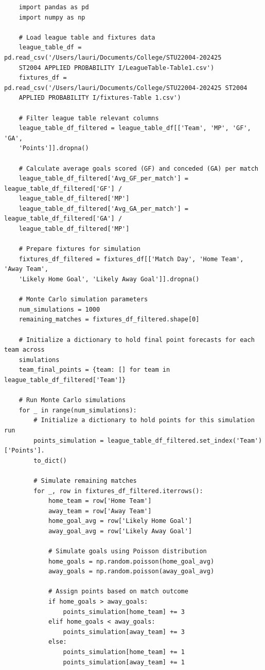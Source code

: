 \documentclass{article}
\begin{document}
\begin{verbatim}
    import pandas as pd
    import numpy as np
    
    # Load league table and fixtures data
    league_table_df = pd.read_csv('/Users/lauri/Documents/College/STU22004-202425 
    ST2004 APPLIED PROBABILITY I/LeagueTable-Table1.csv')
    fixtures_df = pd.read_csv('/Users/lauri/Documents/College/STU22004-202425 ST2004 
    APPLIED PROBABILITY I/fixtures-Table 1.csv')
    
    # Filter league table relevant columns
    league_table_df_filtered = league_table_df[['Team', 'MP', 'GF', 'GA', 
    'Points']].dropna()
    
    # Calculate average goals scored (GF) and conceded (GA) per match
    league_table_df_filtered['Avg_GF_per_match'] = league_table_df_filtered['GF'] / 
    league_table_df_filtered['MP']
    league_table_df_filtered['Avg_GA_per_match'] = league_table_df_filtered['GA'] / 
    league_table_df_filtered['MP']
    
    # Prepare fixtures for simulation
    fixtures_df_filtered = fixtures_df[['Match Day', 'Home Team', 'Away Team', 
    'Likely Home Goal', 'Likely Away Goal']].dropna()
    
    # Monte Carlo simulation parameters
    num_simulations = 1000
    remaining_matches = fixtures_df_filtered.shape[0]
    
    # Initialize a dictionary to hold final point forecasts for each team across 
    simulations
    team_final_points = {team: [] for team in league_table_df_filtered['Team']}
    
    # Run Monte Carlo simulations
    for _ in range(num_simulations):
        # Initialize a dictionary to hold points for this simulation run
        points_simulation = league_table_df_filtered.set_index('Team')['Points'].
        to_dict()
    
        # Simulate remaining matches
        for _, row in fixtures_df_filtered.iterrows():
            home_team = row['Home Team']
            away_team = row['Away Team']
            home_goal_avg = row['Likely Home Goal']
            away_goal_avg = row['Likely Away Goal']
    
            # Simulate goals using Poisson distribution
            home_goals = np.random.poisson(home_goal_avg)
            away_goals = np.random.poisson(away_goal_avg)
    
            # Assign points based on match outcome
            if home_goals > away_goals:
                points_simulation[home_team] += 3
            elif home_goals < away_goals:
                points_simulation[away_team] += 3
            else:
                points_simulation[home_team] += 1
                points_simulation[away_team] += 1
    

\end{verbatim}
\end{document}
